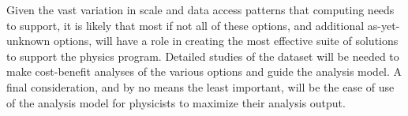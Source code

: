 \documentclass[../main-v1.tex]{subfiles}
\begin{document}

Given the vast variation in scale and data access patterns that  computing needs to support, it is likely that most if not all of these options, and additional as-yet-unknown options, will have a role in creating the most effective suite of solutions to support the physics program. Detailed studies of the  dataset will be needed to make cost-benefit analyses of the various options and guide the analysis model.  A final consideration, and by no means the least important, will be the ease of use of the analysis model for physicists to maximize their analysis output.
\end{document}
